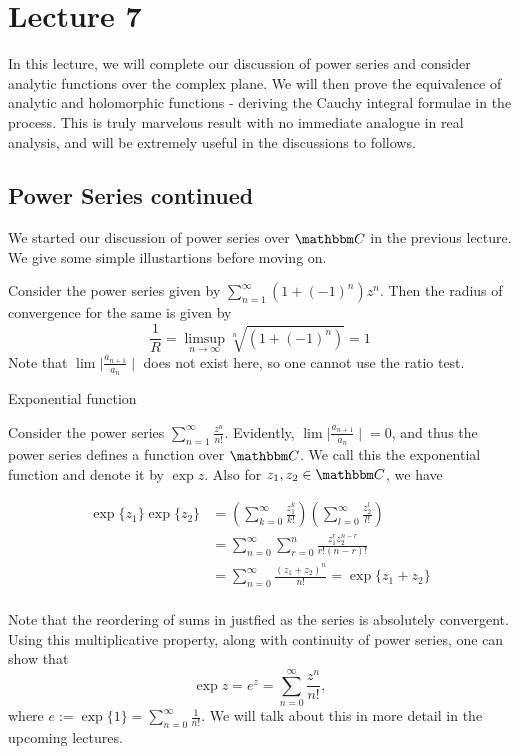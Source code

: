\documentclass[../ComplexAnalysis_Notes.tex]{subfiles}
\begin{document}
\chapter*{Lecture 7} %

\setcounter{chapter}{7} %
\setcounter{section}{0}
\setcounter{equation}{0}
\setcounter{figure}{0}

In this lecture, we will complete our discussion of power series and consider analytic functions over the complex plane. We will then prove the equivalence of analytic and holomorphic functions - deriving the Cauchy integral formulae in the process. This is truly marvelous result with no immediate analogue in real analysis, and will be extremely useful in the discussions to follows.

\section{Power Series continued}
We started our discussion of power series over $\C$ in the previous lecture. We give some simple illustartions before moving on.

\begin{Eg}{}{}
Consider the power series given by $\sum_{n=1}^\infty (1+(-1)^n)z^n$. Then the radius of convergence for the same is given by
\[\frac{1}{R} = \limsup_{n \to \infty} \sqrt[n]{(1+(-1)^n)} = 1\]
Note that $\lim{\mid \frac{a_{n+1}}{a_n} \mid}$ does not exist here, so one cannot use the ratio test. 
\end{Eg}

\begin{Eg}{Exponential function}{}

Consider the power series $\sum_{n=1}^\infty \frac{z^n}{n!}$. Evidently, $\lim {\mid \frac{a_{n+1}}{a_n} \mid} = 0$, and thus the power series defines a function over $\C$. We call this the exponential function and denote it by $\exp{z}$. Also for $z_1, z_2 \in \C$, we have

\begin{align*}
  \exp\{z_1\}\exp\{z_2\} &= \left(\sum_{k=0}^{\infty} \frac{z_1^k}{k!}\right)\left(\sum_{l=0}^{\infty} \frac{z_2^l}{l!}\right)\\
  &= \sum_{n=0}^{\infty} \sum_{r=0}^n \frac{z_1^r z_2^{n-r}}{r!(n-r)!}\\
  &= \sum_{n=0}^{\infty} \frac{(z_1 + z_2)^n}{n!} = \exp\{z_1 + z_2\}\\
\end{align*}

Note that the reordering of sums in justfied as the series is absolutely convergent. Using this multiplicative property, along with continuity of power series, one can show that
\[\exp{z} = e^z = \sum_{n=0}^{\infty} \frac{z^n}{n!},\]
where $e := \exp\{1\} = \sum_{n=0}^{\infty} \frac{1}{n!}$. We will talk about this in more detail in the upcoming lectures.
\end{Eg}
\end{document}
